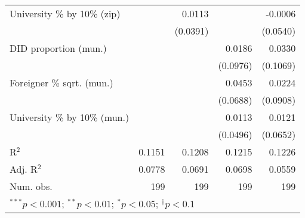 \begin{tabular}{l D{.}{.}{3.5} D{.}{.}{3.5} D{.}{.}{3.5} D{.}{.}{3.5}}
University \% by 10\% (zip)       &          & 0.0113   &          & -0.0006  \\
                                  &          & (0.0391) &          & (0.0540) \\
DID proportion (mun.)             &          &          & 0.0186   & 0.0330   \\
                                  &          &          & (0.0976) & (0.1069) \\
Foreigner \% sqrt. (mun.)         &          &          & 0.0453   & 0.0224   \\
                                  &          &          & (0.0688) & (0.0908) \\
University \% by 10\% (mun.)      &          &          & 0.0113   & 0.0121   \\
                                  &          &          & (0.0496) & (0.0652) \\
\midrule
R$^2$                             & 0.1151   & 0.1208   & 0.1215   & 0.1226   \\
Adj. R$^2$                        & 0.0778   & 0.0691   & 0.0698   & 0.0559   \\
Num. obs.                         & 199      & 199      & 199      & 199      \\
\bottomrule
{}
\end{tabular}
